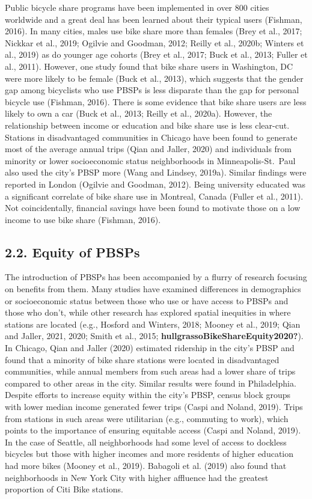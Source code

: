 \documentclass[]{elsarticle} %
\begin{document}
Public bicycle share programs have been implemented in over 800 cities
worldwide and a great deal has been learned about their typical users
(Fishman, 2016). In many cities, males use bike share more than females
(Brey et al., 2017; Nickkar et al., 2019; Ogilvie and Goodman, 2012;
Reilly et al., 2020b; Winters et al., 2019) as do younger age cohorts
(Brey et al., 2017; Buck et al., 2013; Fuller et al., 2011). However,
one study found that bike share users in Washington, DC were more likely
to be female (Buck et al., 2013), which suggests that the gender gap
among bicyclists who use PBSPs is less disparate than the gap for
personal bicycle use (Fishman, 2016). There is some evidence that bike
share users are less likely to own a car (Buck et al., 2013; Reilly et
al., 2020a). However, the relationship between income or education and
bike share use is less clear-cut. Stations in disadvantaged communities
in Chicago have been found to generate most of the average annual trips
(Qian and Jaller, 2020) and individuals from minority or lower
socioeconomic status neighborhoods in Minneapolis-St.~Paul also used the
city's PBSP more (Wang and Lindsey, 2019a). Similar findings were
reported in London (Ogilvie and Goodman, 2012). Being university
educated was a significant correlate of bike share use in Montreal,
Canada (Fuller et al., 2011). Not coincidentally, financial savings have
been found to motivate those on a low income to use bike share (Fishman,
2016).

\hypertarget{equity-of-pbsps}{%
\subsection{2.2. Equity of PBSPs}\label{equity-of-pbsps}}

The introduction of PBSPs has been accompanied by a flurry of research
focusing on benefits from them. Many studies have examined differences
in demographics or socioeconomic status between those who use or have
access to PBSPs and those who don't, while other research has explored
spatial inequities in where stations are located (e.g., Hosford and
Winters, 2018; Mooney et al., 2019; Qian and Jaller, 2021, 2020; Smith
et al., 2015; \textbf{hullgrassoBikeShareEquity2020?}). In Chicago, Qian
and Jaller (2020) estimated ridership in the city's PBSP and found that
a minority of bike share stations were located in disadvantaged
communities, while annual members from such areas had a lower share of
trips compared to other areas in the city. Similar results were found in
Philadelphia. Despite efforts to increase equity within the city's PBSP,
census block groups with lower median income generated fewer trips
(Caspi and Noland, 2019). Trips from stations in such areas were
utilitarian (e.g., commuting to work), which points to the importance of
ensuring equitable access (Caspi and Noland, 2019). In the case of
Seattle, all neighborhoods had some level of access to dockless bicycles
but those with higher incomes and more residents of higher education had
more bikes (Mooney et al., 2019). Babagoli et al. (2019) also found that
neighborhoods in New York City with higher affluence had the greatest
proportion of Citi Bike stations.
\end{document}
